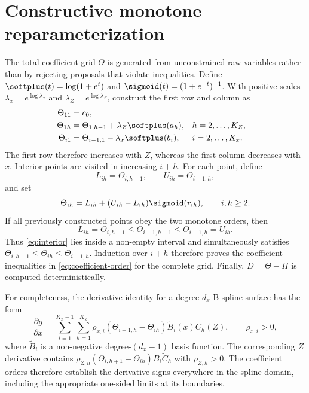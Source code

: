 \appendix
\section{Constructive monotone reparameterization}
\label{app:monotone}

The total coefficient grid $\Theta$ is generated from unconstrained raw
variables rather than by rejecting proposals that violate inequalities.  Define
$\softplus(t)=\log(1+e^t)$ and
$\sigmoid(t)=(1+e^{-t})^{-1}$.  With positive scales
$\lambda_x=e^{\log\lambda_x}$ and $\lambda_Z=e^{\log\lambda_Z}$, construct the
first row and column as
\begin{align}
 \Theta_{11}&=c_0,\\
 \Theta_{1h}&=\Theta_{1,h-1}+\lambda_Z\softplus(a_h),
 &&h=2,\ldots,K_Z,\\
 \Theta_{i1}&=\Theta_{i-1,1}-\lambda_x\softplus(b_i),
 &&i=2,\ldots,K_x.
 \label{eq:boundaries}
\end{align}
The first row therefore increases with $Z$, whereas the first column decreases
with $x$.  Interior points are visited in increasing $i+h$.  For each point,
define
\begin{equation}
 L_{ih}=\Theta_{i,h-1},\qquad U_{ih}=\Theta_{i-1,h},
\end{equation}
and set
\begin{equation}
 \Theta_{ih}=L_{ih}+(U_{ih}-L_{ih})\sigmoid(r_{ih}),
 \qquad i,h\ge2.
 \label{eq:interior}
\end{equation}
If all previously constructed points obey the two monotone orders, then
\begin{equation}
 L_{ih}=\Theta_{i,h-1}\le\Theta_{i-1,h-1}\le
 \Theta_{i-1,h}=U_{ih}.
\end{equation}
Thus \cref{eq:interior} lies inside a non-empty interval and simultaneously
satisfies
$\Theta_{i,h-1}\le\Theta_{ih}\le\Theta_{i-1,h}$.  Induction over $i+h$
therefore proves the coefficient inequalities in \cref{eq:coefficient-order}
for the complete grid.  Finally, $D=\Theta-\Pi$ is computed deterministically.

For completeness, the derivative identity for a degree-$d_x$ B-spline surface
has the form
\begin{equation}
 \frac{\partial g}{\partial x}=
 \sum_{i=1}^{K_x-1}\sum_{h=1}^{K_Z}
 \rho_{x,i}(\Theta_{i+1,h}-\Theta_{ih})
 \widetilde B_i(x)C_h(Z),\qquad \rho_{x,i}>0,
\end{equation}
where $\widetilde B_i$ is a non-negative degree-$(d_x-1)$ basis function.
The corresponding $Z$ derivative contains
$\rho_{Z,h}(\Theta_{i,h+1}-\Theta_{ih})B_i\widetilde C_h$ with
$\rho_{Z,h}>0$.  The coefficient orders therefore establish the derivative
signs everywhere in the spline domain, including the appropriate one-sided
limits at its boundaries.
